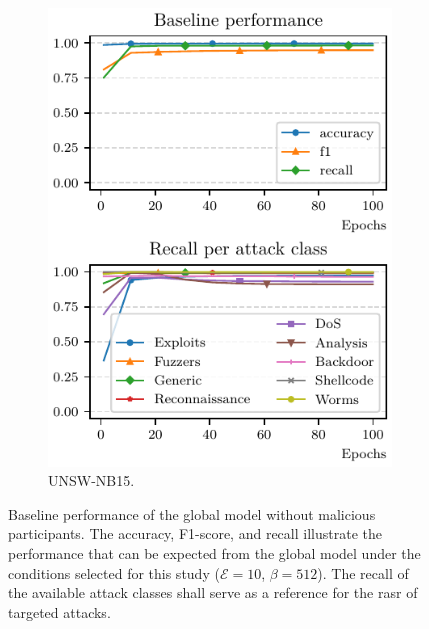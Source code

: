 \begin{figure}[t]
\begin{subfigure}{.45\linewidth}
    \includegraphics[width=\linewidth]{figures/nb15/baseline}
    \caption{
      UNSW-NB15.
      \label{fig:assess.baseline.nb15}
    }
  \end{subfigure}
  \caption[
    Baseline performance of the global model without malicious participants.
  ]{
    Baseline performance of the global model without malicious participants.
    The accuracy, F1-score, and recall illustrate the performance that can be expected from the global model under the conditions selected for this study ($\mathcal{E}=10$, $\beta=512$).
    The recall of the available attack classes shall serve as a reference for the \gls{rasr} of targeted attacks.
    \label{fig:assess.baseline}
  }
\end{figure}



